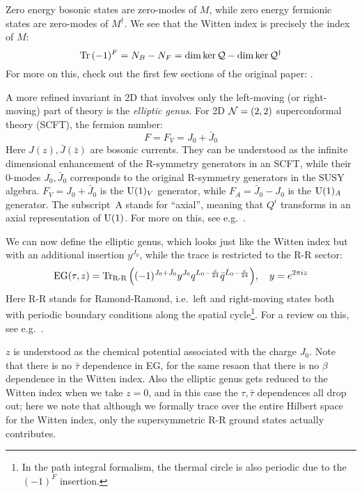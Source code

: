 \documentclass[a4paper
	,10pt
]{article}
\begin{document}
	Zero energy bosonic states are zero-modes of $M$, while zero energy fermionic states are zero-modes of $M^\dagger$. We see that the Witten index is precisely the index of $M$:
	\begin{equation}
		\Tr\,(-1)^F
		= N_B - N_F
		= \dim \ker \mathcal{Q} - \dim \ker \mathcal{Q}^\dagger
	\end{equation}
	For more on this, check out the first few sections of the original paper: \textcite{Witten:1982df}. 
	
	\newparagraph
	A more refined invariant in 2D that involves only the left-moving (or right-moving) part of theory is the \textit{elliptic genus}. For 2D $\mathcal{N} = (2,2)$ superconformal theory (SCFT), the fermion number:
	\begin{equation}
		F = F_V = J_0 + \bar{J}_0
	\end{equation}
	Here $J(z),\bar{J}(\bar{z})$ are bosonic currents. They can be understood as the infinite dimensional enhancement of the R-symmetry generators in an SCFT, while their 0-modes $J_0,\bar{J}_0$ corresponds to the original R-symmetry generators in the SUSY algebra. $F_V = J_0 + \bar{J}_0$ is the $\mathrm{U}(1)_V$ generator, while $F_A = \bar{J}_0 - J_0$ is the $\mathrm{U}(1)_A$ generator. The \mbox{subscript A} stands for ``axial'', meaning that $Q^i$ transforms in an axial representation of $\mathrm{U}(1)$. For more on this, see e.g.~\cite{MauricioStuff}. 
	
	We can now define the elliptic genus, which looks just like the Witten index but with an additional insertion $y^{J_0}$, while the trace is restricted to the R-R sector:
	\begin{equation}
		\mrm{EG}(\tau,z)
		= \Tr_{\text{R-R}} \pqty{
			(-1)^{J_0 + \bar{J}_0}
			y^{J_0}
			q^{L_0 - \frac{c}{24}}
			\bar{q}^{\bar{L}_0 - \frac{c}{24}}
		}, \quad y = e^{2\pi i z}
	\end{equation}
	Here R-R stands for Ramond-Ramond, i.e.\ left and right-moving states both with periodic boundary conditions along the spatial cycle\footnote{
		In the path integral formalism, the thermal circle is also periodic due to the $(-1)^F$ insertion. 
	}. 
	For a review on this, see e.g.~\cite{Anagiannis:2018jqf}. 
	
	$z$ is understood as the chemical potential associated with the charge $J_0$. Note that there is no $\bar{\tau}$ dependence in EG, for the same resaon that there is no $\beta$ dependence in the Witten index. Also the elliptic genus gets reduced to the Witten index when we take $z = 0$, and in this case the $\tau,\bar{\tau}$ dependences all drop out; here we note that although we formally trace over the entire Hilbert space for the Witten index, only the supersymmetric R-R ground states actually contributes. 
	
\end{document}
